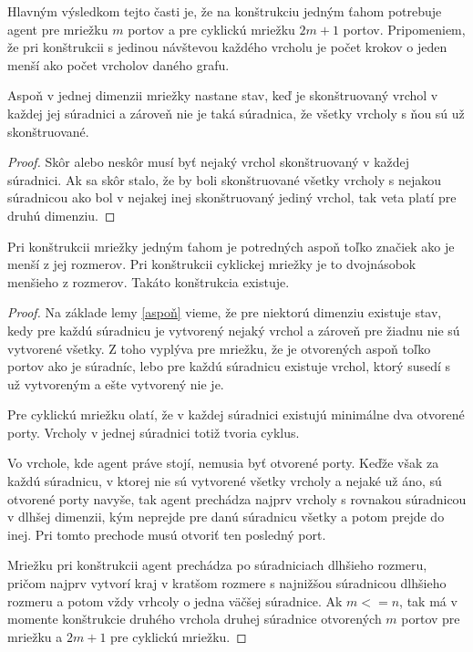 Hlavným výsledkom tejto časti je, že na konštrukciu jedným ťahom potrebuje 
agent pre mriežku $m$ portov a pre
cyklickú mriežku $2m + 1$ portov. Pripomeniem, že pri konštrukcii s jedinou
návštevou každého vrcholu je počet krokov o jeden menší ako počet vrcholov
daného grafu.

\begin{lem}
\label{aspoň}
Aspoň v jednej dimenzii mriežky nastane stav, keď je skonštruovaný vrchol v každej
jej súradnici a zároveň nie je taká súradnica, že všetky vrcholy s ňou sú už
skonštruované.
\end{lem}

\begin{proof}
Skôr alebo neskôr musí byť nejaký vrchol skonštruovaný v každej súradnici.
Ak sa skôr stalo, že by boli skonštruované všetky vrcholy s nejakou
súradnicou ako bol v nejakej inej skonštruovaný jediný vrchol, tak veta
platí pre druhú dimenziu.
\end{proof}

\begin{veta}
Pri konštrukcii mriežky jedným ťahom je potredných aspoň toľko značiek ako
je menší z jej rozmerov. Pri konštrukcii cyklickej mriežky je to dvojnásobok
menšieho z rozmerov. Takáto konštrukcia existuje.
\end{veta}
\begin{proof}
Na základe lemy \ref{aspoň} vieme, že pre niektorú dimenziu existuje stav,
kedy pre každú súradnicu je vytvorený nejaký vrchol a zároveň pre žiadnu nie
sú vytvorené všetky. Z toho vyplýva pre mriežku, že je otvorených aspoň
toľko portov ako je súradníc, lebo pre každú súradnicu existuje vrchol,
ktorý susedí s už vytvoreným a ešte vytvorený nie je.

Pre cyklickú mriežku olatí, že v každej súradnici existujú minimálne dva
otvorené porty. Vrcholy v jednej súradnici totiž tvoria cyklus.

Vo vrchole, kde agent práve stojí, nemusia byť otvorené porty. Keďže však za
každú súradnicu, v ktorej nie sú vytvorené všetky vrcholy a nejaké už áno,
sú otvorené porty navyše, tak agent prechádza najprv vrcholy s rovnakou 
súradnicou v dlhšej dimenzii, kým neprejde pre danú súradnicu všetky a potom
prejde do inej. Pri tomto prechode musú otvoriť ten posledný port.

Mriežku pri konštrukcii agent prechádza po súradniciach dlhšieho rozmeru,
pričom najprv vytvorí kraj v kratšom rozmere s najnižšou súradnicou dlhšieho
rozmeru a potom vždy vrhcoly o jedna väčšej súradnice. Ak $m <= n$, tak má v
momente konštrukcie druhého vrchola druhej súradnice otvorených $m$ portov
pre mriežku a $2m + 1$ pre cyklickú mriežku.
\end{proof}


